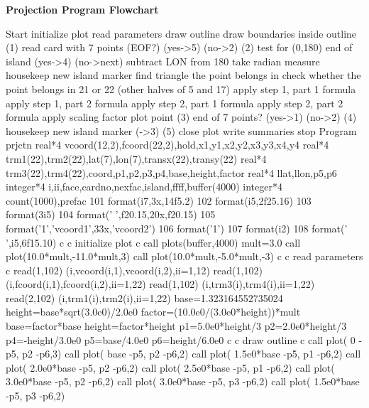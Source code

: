 \vfill\eject
\centerline{\bf Projection Program Flowchart}
\bigbf\bigbf
\line Start
\line initialize plot
\line read parameters
\line draw outline
\line draw boundaries inside outline
\line (1)
\line read card with 7 points (EOF?)
\line (yes->5) (no->2)
\line (2)
\line test for (0,180) end of island
\line (yes->4) (no->next)
\line subtract LON from 180
\line take radian measure
\line housekeep new island marker
\line find triangle the point belongs in
\line check whether the point belongs in 21 or 22 (other halves of 5 and 17)
\line apply step 1, part 1 formula
\line apply step 1, part 2 formula
\line apply step 2, part 1 formula
\line apply step 2, part 2 formula
\line apply scaling factor
\line plot point
\line (3)
\line end of 7 points?
\line (yes->1) (no->2)
\line (4)
\line housekeep new island marker
\line (->3)
\line (5)
\line close plot
\line write summaries
\line stop
\vfill\eject
\verbatim
      Program prjctn
      real*4 vcoord(12,2),fcoord(22,2),hold,x1,y1,x2,y2,x3,y3,x4,y4
      real*4 trm1(22),trm2(22),lat(7),lon(7),transx(22),transy(22)
      real*4 trm3(22),trm4(22),coord,p1,p2,p3,p4,base,height,factor
      real*4 llat,llon,p5,p6
      integer*4 i,ii,face,cardno,nexfac,island,ffff,buffer(4000)
      integer*4 count(1000),prefac
101   format(i7,3x,14f5.2)
102   format(i5,2f25.16)
103   format(3i5)
104   format(' ',f20.15,20x,f20.15)
105   format('1','vcoord1',33x,'vcoord2')
106   format('1')
107   format(i2)
108   format(' ',i5,6f15.10)
c
c initialize plot
c
      call plots(buffer,4000)
      mult=3.0
      call plot(10.0*mult,-11.0*mult,3)
      call plot(10.0*mult,-5.0*mult,-3)
c
c read parameters
c
      read(1,102) (i,vcoord(i,1),vcoord(i,2),ii=1,12)
      read(1,102) (i,fcoord(i,1),fcoord(i,2),ii=1,22)
      read(1,102) (i,trm3(i),trm4(i),ii=1,22)
      read(2,102) (i,trm1(i),trm2(i),ii=1,22)
      base=1.323164552735024
      height=base*sqrt(3.0e0)/2.0e0
      factor=(10.0e0/(3.0e0*height))*mult
      base=factor*base
      height=factor*height
      p1=5.0e0*height/3
      p2=2.0e0*height/3
      p4=-height/3.0e0
      p5=base/4.0e0
      p6=height/6.0e0
c
c draw outline
c
      call plot( 0            -p5, p2                  -p6,3)
      call plot( base         -p5, p2                  -p6,2)
      call plot( 1.5e0*base   -p5, p1                  -p6,2)
      call plot( 2.0e0*base   -p5, p2                  -p6,2)
      call plot( 2.5e0*base   -p5, p1                  -p6,2)
      call plot( 3.0e0*base   -p5, p2                  -p6,2)
      call plot( 3.0e0*base   -p5, p3                  -p6,2)
      call plot( 1.5e0*base   -p5, p3                  -p6,2)
